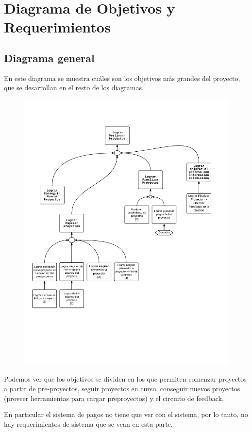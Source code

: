 \section{Diagrama de Objetivos y Requerimientos}
\subsection{Diagrama general}
En este diagrama se muestra cuáles son los objetivos más grandes del proyecto, que se desarrollan en el resto de los diagramas.
\begin{figure}[H]
\includegraphics[width=\textwidth, clip=true, trim=15pt 170pt 15pt 80pt]{imagenes/objetivos/objetivos10.pdf}
\end{figure}
Podemos ver que los objetivos se dividen en los que permiten comenzar proyectos a partir de pre-proyectos, seguir proyectos en curso, conseguir nuevos proyectos (proveer herramientas para cargar preproyectos) y el circuito de feedback.

En particular el sistema de pagos no tiene que ver con el sistema, por lo tanto, no hay requerimientos de sistema que se vean en esta parte.

